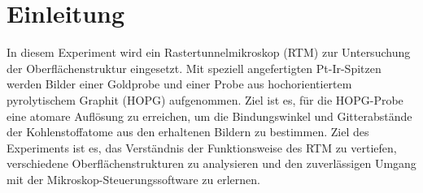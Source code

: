 \chapter{Einleitung}

In diesem Experiment wird ein Rastertunnelmikroskop (RTM) zur Untersuchung der Oberflächenstruktur eingesetzt. Mit speziell angefertigten Pt-Ir-Spitzen werden Bilder einer Goldprobe und einer Probe aus hochorientiertem pyrolytischem Graphit (HOPG) aufgenommen. Ziel ist es, für die HOPG-Probe eine atomare Auflösung zu erreichen, um die Bindungswinkel und Gitterabstände der Kohlenstoffatome aus den erhaltenen Bildern zu bestimmen. Ziel des Experiments ist es, das Verständnis der Funktionsweise des RTM zu vertiefen, verschiedene Oberflächenstrukturen zu analysieren und den zuverlässigen Umgang mit der Mikroskop-Steuerungssoftware zu erlernen.